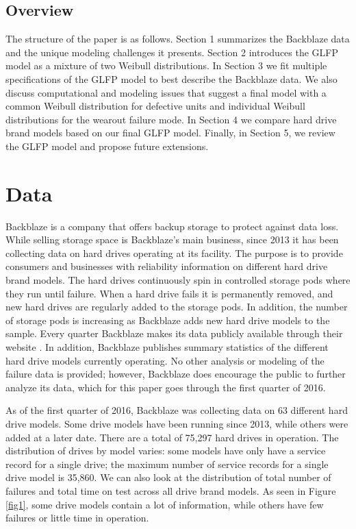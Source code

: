 \documentclass[12pt]{article}
\begin{document}
\subsection{Overview}
The structure of the paper is as follows.  Section 1 summarizes the Backblaze data and the unique modeling challenges it presents.  Section 2 introduces the GLFP model as a mixture of two Weibull distributions.  In Section 3 we fit multiple specifications of the GLFP model to best describe the Backblaze data.  We also discuss computational and modeling issues that suggest a final model with a common Weibull distribution for defective units and individual Weibull distributions for the wearout failure mode.  In Section 4 we compare hard drive brand models based on our final GLFP model.  Finally, in Section 5, we review the GLFP model and propose future extensions.

\section{Data}
Backblaze is a company that offers backup storage to protect against data loss.  While selling storage space is Backblaze's main business, since 2013 it has been collecting data on hard drives operating at its facility.  The purpose is to provide consumers and businesses with reliability information on different hard drive brand models.  The hard drives continuously spin in controlled storage pods where they run until failure.  When a hard drive fails it is permanently removed, and new hard drives are regularly added to the storage pods.  In addition, the number of storage pods is increasing as Backblaze adds new hard drive models to the sample.  Every quarter Backblaze makes its data publicly available through their website \cite{backblaze}. In addition, Backblaze publishes summary statistics of the different hard drive models currently operating.  No other analysis or modeling of the failure data is provided; however, Backblaze does encourage the public to further analyze its data, which for this paper goes through the first quarter of 2016.

As of the first quarter of 2016, Backblaze was collecting data on 63 different hard drive models.  Some drive models have been running since 2013, while others were added at a later date.  There are a total of 75,297 hard drives in operation.  The distribution of drives by model varies: some models have only have a service record for a single drive; the maximum number of service records for a single drive model is 35,860.  We can also look at the distribution of total number of failures and total time on test across all drive brand models.  As seen in Figure \ref{fig1}, some drive models contain a lot of information, while others have few failures or little time in operation.  
\end{document}
